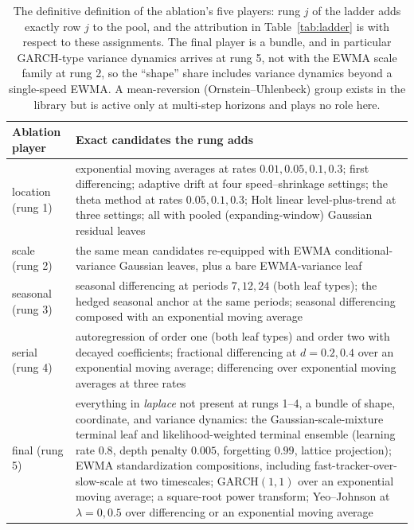 \documentclass[11pt]{article}
\theoremstyle{remark}
\begin{document}
\begin{table}[t]
\centering
\small
\begin{tabular}{lp{}}
\toprule
Ablation player & Exact candidates the rung adds\\
\midrule
location (rung 1) & exponential moving averages at rates $0.01,0.05,0.1,0.3$; first
differencing; adaptive drift at four speed--shrinkage settings; the theta method at rates
$0.05,0.1,0.3$; Holt linear level-plus-trend at three settings; all with pooled
(expanding-window) Gaussian residual leaves\\
scale (rung 2) & the same mean candidates re-equipped with EWMA conditional-variance Gaussian
leaves, plus a bare EWMA-variance leaf\\
seasonal (rung 3) & seasonal differencing at periods $7,12,24$ (both leaf types); the hedged
seasonal anchor at the same periods; seasonal differencing composed with an exponential
moving average\\
serial (rung 4) & autoregression of order one (both leaf types) and order two with decayed
coefficients; fractional differencing at $d=0.2,0.4$ over an exponential moving average;
differencing over exponential moving averages at three rates\\
final (rung 5) & everything in \emph{laplace} not present at rungs 1--4, a bundle of shape,
coordinate,
and variance dynamics: the Gaussian-scale-mixture terminal leaf and likelihood-weighted
terminal ensemble (learning rate $0.8$, depth penalty $0.005$, forgetting $0.99$, lattice
projection); EWMA standardization compositions, including fast-tracker-over-slow-scale at two
timescales; GARCH$(1,1)$ over an exponential moving average; a square-root power transform;
Yeo--Johnson at $\lambda=0,0.5$ over differencing or an exponential moving average\\
\bottomrule
\end{tabular}
\caption{The definitive definition of the ablation's five players: rung $j$ of the ladder
adds exactly row $j$ to the pool, and the attribution in Table~\ref{tab:ladder} is with
respect to these assignments. The final player is a bundle, and in particular GARCH-type
variance
dynamics arrives at rung 5, not with the EWMA scale family at rung 2, so the ``shape'' share
includes variance dynamics beyond a single-speed EWMA. A mean-reversion
(Ornstein--Uhlenbeck) group exists in the library but is active only at multi-step horizons
and plays no role here.}
\label{tab:grammar}
\end{table}
\end{document}
